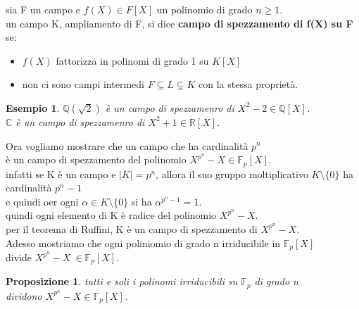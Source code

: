 \documentclass[a4paper,12pt]{article}
\theoremstyle{def}
\theoremstyle{prop}
\newtheorem*{proposition}{Proposizione}
\theoremstyle{esempio}
\newtheorem*{example}{Esempio}
\theoremstyle{dimostrazione}
\theoremstyle{teo}
\theoremstyle{osservazione}
\begin{document}
sia F un campo e \(f(X) \in F[X]\) un polinomio di grado \(n \geq 1\).\\
un campo K, ampliamento di F, si dice \textbf{campo di spezzamento di f(X) su F} se:\\  
\begin{itemize}
	\item \(f(X)\) fattorizza in polinomi di grado 1 su \(K[X]\)
	\item non ci sono campi intermedi \(F \subseteq L \subsetneq K\) con la stessa proprietà.
\end{itemize}

\begin{example}
	\(\mathbb{Q}(\sqrt{2})\) è un campo di spezzamenro di \(X^2 - 2 \in \mathbb{Q}[X]\).\\
	\(\mathbb{C}\) è un campo di spezzamenro di \(X^2 + 1 \in \mathbb{R}[X]\).\\
\end{example}

\newpage

Ora vogliamo mostrare che un campo che ha cardinalità \(p^n\)\\
è un campo di spezzamento del polinomio \(X^{p^n} - X \in \mathbb{F}_p[X]\).\\
infatti se K è un campo e \(|K| = p^n\), allora il suo gruppo moltiplicativo \(K \setminus \{0\}\) ha cardinalità \(p^n - 1\)\\
e quindi oer ogni \(\alpha \in K \setminus \{0\}\) si ha \(\alpha^{p^n - 1} = 1\).\\
quindi ogni elemento di K è radice del polinomio \(X^{p^n} - X\).\\
per il teorema di Ruffini, K è un campo di spezzamento di \(X^{p^n} - X\).\\
Adesso mostriamo che ogni poliniomio di grado n irriducibile in \(\mathbb{F}_p[X]\)\\
divide \(X^{p^n} - X\ \in \mathbb{F}_p[X]\).\\

\begin{proposition}
	tutti e soli i polinomi irriducibili su \(\mathbb{F}_p\) di grado n\\
	dividono \(X^{p^n} - X \in \mathbb{F}_p[X]\).
\end{proposition}
\end{document}
